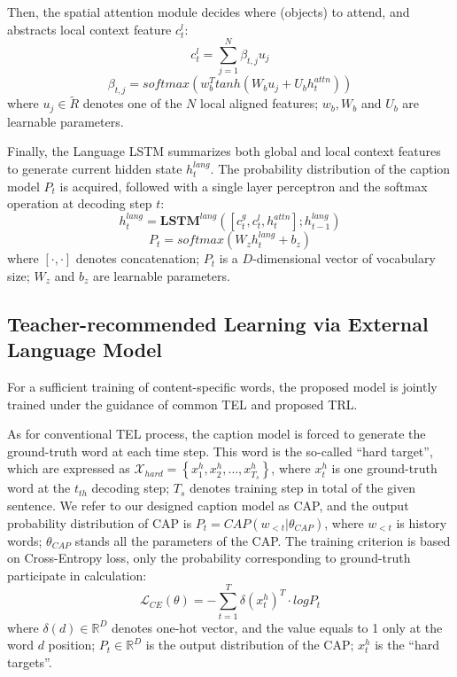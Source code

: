 \documentclass[10pt,twocolumn,letterpaper]{article}
\begin{document}
Then, the spatial attention module decides where (objects) to attend, and abstracts local context feature $c_t^l$:
\[ c_t^l = \sum_{j=1}^{N}{\beta_{t,j}u_j} \]
\begin{equation}\label{key}
\beta_{t,j} = softmax\left( w_b^T tanh\left( W_bu_j + U_bh_t^{attn}\right) \right)
\end{equation}
where $u_j \in \tilde{R}$ denotes one of the $N$ local aligned features; $w_b,W_b$ and $U_b$ are learnable parameters.

Finally, the Language LSTM summarizes both global and local context features to generate current hidden state $h_t^{lang}$. The probability distribution of the caption model $P_{t}$ is acquired, followed with a single layer perceptron and the softmax operation at decoding step $t$:
\begin{equation}\label{key}
h_t^{lang} = \textbf{LSTM}^{lang}\left( \left[ c_t^g,c_t^l,h_t^{attn}\right]; h_{t-1}^{lang} \right)
\end{equation}
\begin{equation}\label{key}
P_{t} = softmax(W_zh_t^{lang}+b_z)
\end{equation}
where $[\cdot,\cdot]$ denotes concatenation; $P_{t}$ is a $D$-dimensional vector of vocabulary size; $W_z$ and $b_z$ are learnable parameters.



\subsection{Teacher-recommended Learning via External Language Model}

For a sufficient training of content-specific words, the proposed model is jointly trained under the guidance of common TEL and proposed TRL.

As for conventional TEL process, the caption model is forced to generate the ground-truth word at each time step. This word is the so-called ``hard target'', which are expressed as $ \mathcal{X}_{hard} = \left\lbrace x_1^h,x_2^h,\dots,x_{T_s}^h \right\rbrace $, where $ x_t^h $ is one ground-truth word at the $ t_{th} $ decoding step; $T_s$ denotes training step in total of the given sentence. We refer to our designed caption model as CAP, and the output probability distribution of CAP is $P_t = CAP(w_{<t}|\theta_{CAP})$, where $w_{<t}$ is history words; $\theta_{CAP}$ stands all the parameters of the CAP. The training criterion is based on Cross-Entropy loss, only the probability corresponding to ground-truth participate in calculation:
\begin{equation}\label{key}
\mathcal{L}_{CE}(\theta) = - \sum_{t=1}^{T} \delta(x_t^h)^T \cdot logP_t
\end{equation}
where $\delta(d)\in \mathbb{R}^{D}$ denotes one-hot vector, and the value equals to 1 only at the word $d$ position; $P_t\in\mathbb{R}^{D}$ is the output distribution of the CAP; $x^h_t$ is the ``hard targets''. 
\end{document}
